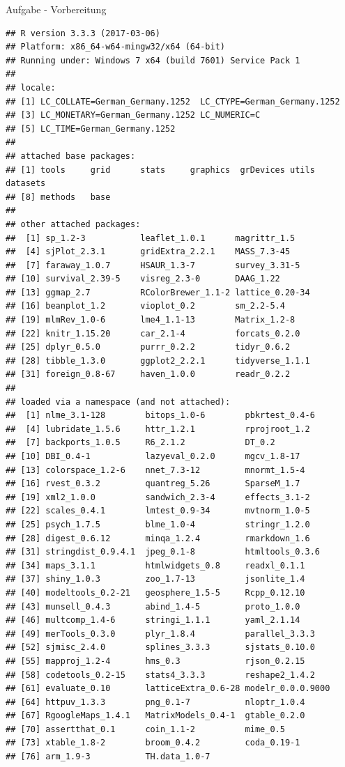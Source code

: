\documentclass[ignorenonframetext,]{beamer}
\begin{document}
\begin{frame}[fragile]{Aufgabe - Vorbereitung}
\begin{verbatim}
## R version 3.3.3 (2017-03-06)
## Platform: x86_64-w64-mingw32/x64 (64-bit)
## Running under: Windows 7 x64 (build 7601) Service Pack 1
## 
## locale:
## [1] LC_COLLATE=German_Germany.1252  LC_CTYPE=German_Germany.1252   
## [3] LC_MONETARY=German_Germany.1252 LC_NUMERIC=C                   
## [5] LC_TIME=German_Germany.1252    
## 
## attached base packages:
## [1] tools     grid      stats     graphics  grDevices utils     datasets 
## [8] methods   base     
## 
## other attached packages:
##  [1] sp_1.2-3           leaflet_1.0.1      magrittr_1.5      
##  [4] sjPlot_2.3.1       gridExtra_2.2.1    MASS_7.3-45       
##  [7] faraway_1.0.7      HSAUR_1.3-7        survey_3.31-5     
## [10] survival_2.39-5    visreg_2.3-0       DAAG_1.22         
## [13] ggmap_2.7          RColorBrewer_1.1-2 lattice_0.20-34   
## [16] beanplot_1.2       vioplot_0.2        sm_2.2-5.4        
## [19] mlmRev_1.0-6       lme4_1.1-13        Matrix_1.2-8      
## [22] knitr_1.15.20      car_2.1-4          forcats_0.2.0     
## [25] dplyr_0.5.0        purrr_0.2.2        tidyr_0.6.2       
## [28] tibble_1.3.0       ggplot2_2.2.1      tidyverse_1.1.1   
## [31] foreign_0.8-67     haven_1.0.0        readr_0.2.2       
## 
## loaded via a namespace (and not attached):
##  [1] nlme_3.1-128        bitops_1.0-6        pbkrtest_0.4-6     
##  [4] lubridate_1.5.6     httr_1.2.1          rprojroot_1.2      
##  [7] backports_1.0.5     R6_2.1.2            DT_0.2             
## [10] DBI_0.4-1           lazyeval_0.2.0      mgcv_1.8-17        
## [13] colorspace_1.2-6    nnet_7.3-12         mnormt_1.5-4       
## [16] rvest_0.3.2         quantreg_5.26       SparseM_1.7        
## [19] xml2_1.0.0          sandwich_2.3-4      effects_3.1-2      
## [22] scales_0.4.1        lmtest_0.9-34       mvtnorm_1.0-5      
## [25] psych_1.7.5         blme_1.0-4          stringr_1.2.0      
## [28] digest_0.6.12       minqa_1.2.4         rmarkdown_1.6      
## [31] stringdist_0.9.4.1  jpeg_0.1-8          htmltools_0.3.6    
## [34] maps_3.1.1          htmlwidgets_0.8     readxl_0.1.1       
## [37] shiny_1.0.3         zoo_1.7-13          jsonlite_1.4       
## [40] modeltools_0.2-21   geosphere_1.5-5     Rcpp_0.12.10       
## [43] munsell_0.4.3       abind_1.4-5         proto_1.0.0        
## [46] multcomp_1.4-6      stringi_1.1.1       yaml_2.1.14        
## [49] merTools_0.3.0      plyr_1.8.4          parallel_3.3.3     
## [52] sjmisc_2.4.0        splines_3.3.3       sjstats_0.10.0     
## [55] mapproj_1.2-4       hms_0.3             rjson_0.2.15       
## [58] codetools_0.2-15    stats4_3.3.3        reshape2_1.4.2     
## [61] evaluate_0.10       latticeExtra_0.6-28 modelr_0.0.0.9000  
## [64] httpuv_1.3.3        png_0.1-7           nloptr_1.0.4       
## [67] RgoogleMaps_1.4.1   MatrixModels_0.4-1  gtable_0.2.0       
## [70] assertthat_0.1      coin_1.1-2          mime_0.5           
## [73] xtable_1.8-2        broom_0.4.2         coda_0.19-1        
## [76] arm_1.9-3           TH.data_1.0-7
\end{verbatim}

\end{frame}
\end{document}
